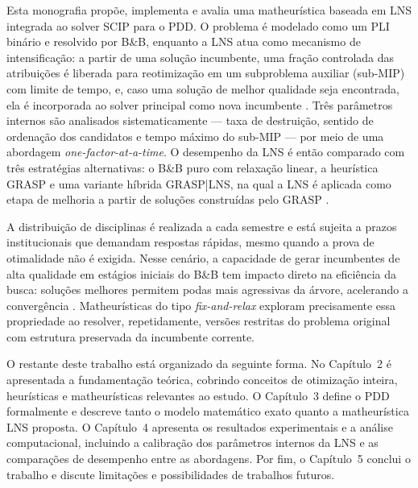 Esta monografia propõe, implementa e avalia uma matheurística baseada em LNS integrada ao solver SCIP para o PDD. O problema é modelado como um PLI binário e resolvido por B\&B, enquanto a LNS atua como mecanismo de intensificação: a partir de uma solução incumbente, uma fração controlada das atribuições é liberada para reotimização em um subproblema auxiliar (sub-MIP) com limite de tempo, e, caso uma solução de melhor qualidade seja encontrada, ela é incorporada ao solver principal como nova incumbente \cite{pisinger_ropke_2010}. Três parâmetros internos são analisados sistematicamente --- taxa de destruição, sentido de ordenação dos candidatos e tempo máximo do sub-MIP --- por meio de uma abordagem \textit{one-factor-at-a-time}. O desempenho da LNS é então comparado com três estratégias alternativas: o B\&B puro com relaxação linear, a heurística GRASP \cite{jhonatan_grasp_dpd} e uma variante híbrida GRASP|LNS, na qual a LNS é aplicada como etapa de melhoria a partir de soluções construídas pelo GRASP \cite{boschetti_letchford_maniezzo_2023,maniezzo_stutzle_voss_2021}.

A distribuição de disciplinas é realizada a cada semestre e está sujeita a prazos institucionais que demandam respostas rápidas, mesmo quando a prova de otimalidade não é exigida. Nesse cenário, a capacidade de gerar incumbentes de alta qualidade em estágios iniciais do B\&B tem impacto direto na eficiência da busca: soluções melhores permitem podas mais agressivas da árvore, acelerando a convergência \cite{neto_hoshino_pedrotti_2023}. Matheurísticas do tipo \textit{fix-and-relax} exploram precisamente essa propriedade ao resolver, repetidamente, versões restritas do problema original com estrutura preservada da incumbente corrente.

O restante deste trabalho está organizado da seguinte forma. No Capítulo~2 é apresentada a fundamentação teórica, cobrindo conceitos de otimização inteira, heurísticas e matheurísticas relevantes ao estudo. O Capítulo~3 define o PDD formalmente e descreve tanto o modelo matemático exato quanto a matheurística LNS proposta. O Capítulo~4 apresenta os resultados experimentais e a análise computacional, incluindo a calibração dos parâmetros internos da LNS e as comparações de desempenho entre as abordagens. Por fim, o Capítulo~5 conclui o trabalho e discute limitações e possibilidades de trabalhos futuros.
